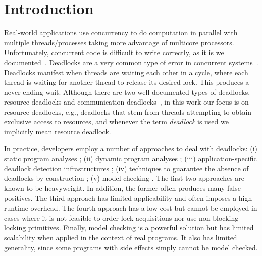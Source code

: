 \section{Introduction}

Real-world applications use concurrency to do computation in parallel with multiple threads/processes taking more advantage of multicore processors. Unfortunately, concurrent code is difficult to write correctly, as it is well documented~\cite{lu}. Deadlocks are a very common type of error in concurrent systems~\cite{lu}.
Deadlocks manifest when threads are waiting each other in a cycle, where each thread is waiting for another thread to release its desired lock. This produces a never-ending wait.
Although there are two well-documented types of deadlocks, resource deadlocks and communication deadlocks~\cite{singhal}\cite{knapp}, in this work our focus is on resource deadlocks, e.g., deadlocks that stem from threads attempting to obtain exclusive access to resources, and whenever the term \emph{deadlock} is used we implicitly mean resource deadlock.

In practice, developers employ a number of approaches to deal with deadlocks: (i) static program analyses \cite{marino}\cite{dawson}\cite{vivek}\cite{williams}; (ii) dynamic program analyses \cite{mcsdk}\cite{magicfuzzer}\cite{sammati}\cite{serenity}\cite{pyla}\cite{rx}; (iii) application-specific deadlock detection infrastructures \cite{orderedlock}; (iv) techniques to guarantee the absence of deadlocks by construction \cite{marino}; (v) model checking \cite{havelund}. The first two approaches are known to be heavyweight. In addition, the former often produces many false positives. The third approach has limited applicability and often imposes a high runtime overhead. The fourth approach has a low cost but cannot be employed in cases where it is not feasible to order lock acquisitions nor use non-blocking locking primitives. Finally, model checking is a powerful solution but has limited scalability when applied in the context of real programs. It also has limited generality, since some programs with side effects simply cannot be model checked.  

